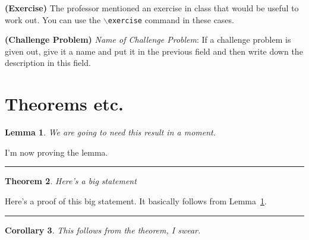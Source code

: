 \documentclass{article}
\newcounter{lecnum}
\newcommand{\challenge}[2]{\noindent \textbf{(Challenge Problem)} \emph{#1}: #2 }
\newcommand{\exercise}[1]{\noindent \textbf{(Exercise)} #1 }
\newtheorem{theorem}{Theorem}[lecnum]
\newtheorem{lemma}[theorem]{Lemma}
\newtheorem{corollary}[theorem]{Corollary}
\newenvironment{proof}{{\bf Proof:}}{\hfill\rule{2mm}{2mm}}
\begin{document}
\exercise{The professor mentioned an exercise in class that would be useful to work out. You can use the \texttt{$\backslash$exercise} command in these cases.}

\challenge{Name of Challenge Problem}{If a challenge problem is given out, give it a name and put it in the previous field and then write down the description in this field.}

\section{Theorems etc.}

\begin{lemma} \label{lem:biglemma}
  We are going to need this result in a moment.
\end{lemma}
\begin{proof}
  I'm now proving the lemma.
\end{proof}

\begin{theorem}
  Here's a big statement
\end{theorem}
\begin{proof}
  Here's a proof of this big statement. It basically follows from Lemma~\ref{lem:biglemma}.  
\end{proof}

\begin{corollary}
  This follows from the theorem, I swear.
\end{corollary}
\end{document}
